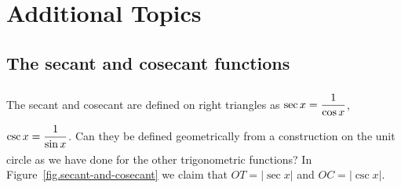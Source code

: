 
\chapter{Additional Topics}

\section{The secant and cosecant functions}

The secant and cosecant are defined on right triangles as $\sec x = \rule[-10pt]{0pt}{28pt}\disfrac{1}{\cos x}$, $\csc x = \rule[-10pt]{0pt}{28pt}\disfrac{1}{\sin x}$.
Can they be defined geometrically from a construction on the unit circle as we have done for the other trigonometric functions?
In Figure~\ref{fig.secant-and-cosecant} we claim that $OT=|\sec x|$ and $OC=|\csc x|$. 

